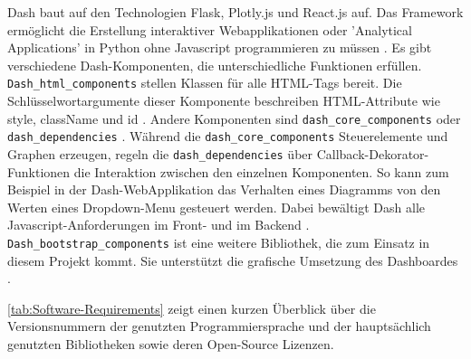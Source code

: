     Dash baut auf den Technologien Flask, Plotly.js und React.js auf. Das Framework ermöglicht die Erstellung interaktiver Webapplikationen 
    oder 'Analytical Applications' in Python ohne Javascript programmieren zu müssen \cite[vgl.][]{plotly_dash_2021}.
    Es gibt verschiedene Dash-Komponenten, die unterschiedliche Funktionen erfüllen. \texttt{Dash\_html\_components} stellen Klassen für alle HTML-Tags bereit.
    Die Schlüsselwortargumente dieser Komponente beschreiben HTML-Attribute wie style, className und id \cite[vgl.][]{plotly_dash_2021-2}. 
    Andere Komponenten sind \texttt{dash\_core\_components} oder \texttt{dash\_dependencies} \cite[vgl.][]{plotly_dash_2021-1}. Während die \texttt{dash\_core\_components}
    Steuerelemente und Graphen erzeugen, regeln die \texttt{dash\_dependencies} über Callback-Dekorator-Funktionen die Interaktion zwischen den einzelnen Komponenten.
    So kann zum Beispiel in der Dash-WebApplikation das Verhalten eines Diagramms von den Werten eines Dropdown-Menu gesteuert werden. 
    Dabei bewältigt Dash alle Javascript-Anforderungen im Front- und im Backend \cite[vgl.][]{plotly_dash_2021-3}.
    \texttt{Dash\_bootstrap\_components} ist eine weitere Bibliothek, die zum Einsatz in diesem Projekt kommt. Sie unterstützt die grafische Umsetzung
    des Dashboardes \cite[vgl.][]{faculty_dash_2021}.

    \autoref{tab:Software-Requirements} zeigt einen kurzen Überblick über die Versionsnummern der genutzten Programmiersprache und der hauptsächlich 
    genutzten Bibliotheken sowie deren Open-Source Lizenzen.
    
